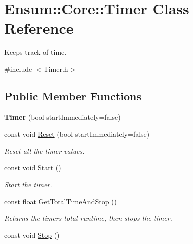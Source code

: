\hypertarget{class_ensum_1_1_core_1_1_timer}{}\section{Ensum\+:\+:Core\+:\+:Timer Class Reference}
\label{class_ensum_1_1_core_1_1_timer}


Keeps track of time.  




{\ttfamily \#include $<$Timer.\+h$>$}

\subsection*{Public Member Functions}
\begin{DoxyCompactItemize}
\item 
{\bfseries Timer} (bool start\+Immediately=false)\hypertarget{class_ensum_1_1_core_1_1_timer_a00fb09cc574dbebe502b40d1d627c85b}{}\label{class_ensum_1_1_core_1_1_timer_a00fb09cc574dbebe502b40d1d627c85b}

\item 
const void \hyperlink{class_ensum_1_1_core_1_1_timer_ae34e21c17fe8325daf806f2f30980fab}{Reset} (bool start\+Immediately=false)
\begin{DoxyCompactList}\small\item\em Reset all the timer values. \end{DoxyCompactList}\item 
const void \hyperlink{class_ensum_1_1_core_1_1_timer_a3f8cd57aade8eb858d68ba376053df25}{Start} ()\hypertarget{class_ensum_1_1_core_1_1_timer_a3f8cd57aade8eb858d68ba376053df25}{}\label{class_ensum_1_1_core_1_1_timer_a3f8cd57aade8eb858d68ba376053df25}

\begin{DoxyCompactList}\small\item\em Start the timer. \end{DoxyCompactList}\item 
const float \hyperlink{class_ensum_1_1_core_1_1_timer_ae6a7f78e18573adc4378485519bc2daf}{Get\+Total\+Time\+And\+Stop} ()\hypertarget{class_ensum_1_1_core_1_1_timer_ae6a7f78e18573adc4378485519bc2daf}{}\label{class_ensum_1_1_core_1_1_timer_ae6a7f78e18573adc4378485519bc2daf}

\begin{DoxyCompactList}\small\item\em Returns the timers total runtime, then stops the timer. \end{DoxyCompactList}\item 
const void \hyperlink{class_ensum_1_1_core_1_1_timer_a0b65dc7246e0ac5498ac3f2ede1f2c29}{Stop} ()\hypertarget{class_ensum_1_1_core_1_1_timer_a0b65dc7246e0ac5498ac3f2ede1f2c29}{}\label{class_ensum_1_1_core_1_1_timer_a0b65dc7246e0ac5498ac3f2ede1f2c29}


\end{DoxyCompactItemize}
